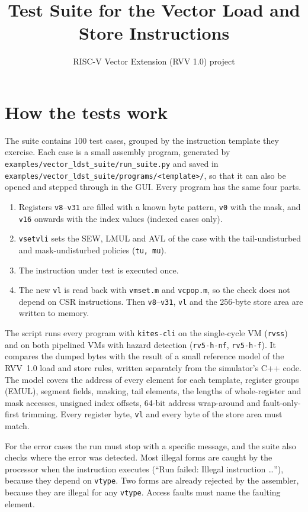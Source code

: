 \documentclass[11pt,a4paper]{article}
\title{Test Suite for the Vector Load and Store Instructions}
\author{RISC-V Vector Extension (RVV 1.0) project}
\date{}
\begin{document}
\maketitle

\section*{How the tests work}

The suite contains 100 test cases, grouped by the instruction template they exercise. Each case is
a small assembly program, generated by \texttt{examples/vector\_ldst\_suite/run\_suite.py} and
saved in \texttt{examples/vector\_ldst\_suite/programs/<template>/}, so that it can also be opened
and stepped through in the GUI. Every program has the same four parts.

\begin{enumerate}
    \item Registers \texttt{v8}--\texttt{v31} are filled with a known byte pattern, \texttt{v0}
    with the mask, and \texttt{v16} onwards with the index values (indexed cases only).
    \item \texttt{vsetvli} sets the SEW, LMUL and AVL of the case with the tail-undisturbed and
    mask-undisturbed policies (\texttt{tu, mu}).
    \item The instruction under test is executed once.
    \item The new \texttt{vl} is read back with \texttt{vmset.m} and \texttt{vcpop.m}, so the check does not
    depend on CSR instructions. Then
    \texttt{v8}--\texttt{v31}, \texttt{vl} and the 256-byte store area are written to memory.
\end{enumerate}

The script runs every program with \texttt{kites-cli} on the single-cycle VM (\texttt{rvss}) and
on both pipelined VMs with hazard detection (\texttt{rv5-h-nf}, \texttt{rv5-h-f}). It compares the
dumped bytes with the result of a small reference model of the RVV~1.0 load and store rules,
written separately from the simulator's C++ code. The model covers the address of every element
for each template, register groups (EMUL), segment fields, masking, tail elements, the lengths of
whole-register and mask accesses, unsigned index offsets, 64-bit address wrap-around and
fault-only-first trimming. Every register byte, \texttt{vl} and every byte of the store area must
match.

For the error cases the run must stop with a specific message, and the suite also checks where
the error was detected. Most illegal forms are caught by the processor when the instruction
executes (``Run failed: Illegal instruction \ldots''), because they depend on \texttt{vtype}. Two
forms are already rejected by the assembler, because they are illegal for any \texttt{vtype}.
Access faults must name the faulting element.
\end{document}
